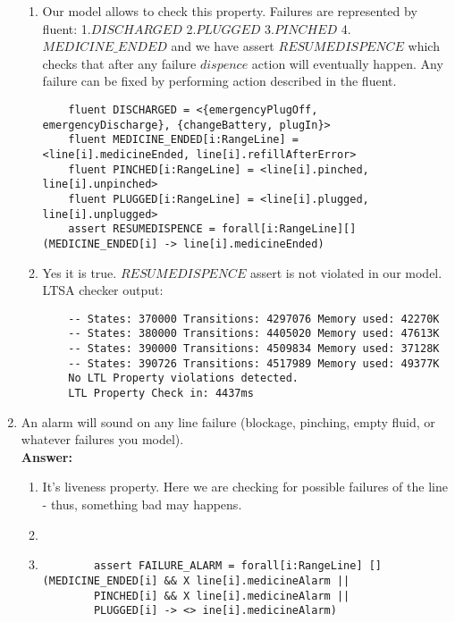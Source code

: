 \documentclass{article}
\begin{document}
\begin{enumerate}
\begin{enumerate}
    \item Our model allows to check this property. Failures are represented by fluent: 1.$DISCHARGED$ 2.$PLUGGED$ 
    3.$PINCHED$ 4.$MEDICINE\_ENDED$ and we have assert $RESUMEDISPENCE$ which checks that after any failure $dispence$ action
    will eventually happen. Any failure can be fixed by performing action described in the fluent.\\
    \begin{verbatim}
    fluent DISCHARGED = <{emergencyPlugOff, emergencyDischarge}, {changeBattery, plugIn}>
    fluent MEDICINE_ENDED[i:RangeLine] = <line[i].medicineEnded, line[i].refillAfterError>
    fluent PINCHED[i:RangeLine] = <line[i].pinched, line[i].unpinched>
    fluent PLUGGED[i:RangeLine] = <line[i].plugged, line[i].unplugged>
    assert RESUMEDISPENCE = forall[i:RangeLine][](MEDICINE_ENDED[i] -> line[i].medicineEnded)
    \end{verbatim}
    
    \item Yes it is true. $RESUMEDISPENCE$ assert is not violated in our model. LTSA checker output:
    \begin{verbatim}
    -- States: 370000 Transitions: 4297076 Memory used: 42270K
    -- States: 380000 Transitions: 4405020 Memory used: 47613K
    -- States: 390000 Transitions: 4509834 Memory used: 37128K
    -- States: 390726 Transitions: 4517989 Memory used: 49377K
    No LTL Property violations detected.
    LTL Property Check in: 4437ms
    \end{verbatim} 
    \end{enumerate}    
    
    \item An alarm will sound on any line failure (blockage, pinching, empty fluid, or whatever failures you model). \\
    \textbf{Answer:}
    \begin{enumerate}
    	\item It's liveness property. Here we are checking for possible failures of the line - thus, something bad may
    	happens.
		\item 
		\item 
		\begin{verbatim}
		assert FAILURE_ALARM = forall[i:RangeLine] [] (MEDICINE_ENDED[i] && X line[i].medicineAlarm || 
		PINCHED[i] && X line[i].medicineAlarm || 
		PLUGGED[i] -> <> ine[i].medicineAlarm)
		\end{verbatim}
	\end{enumerate}
	

\end{enumerate}
\end{document}
